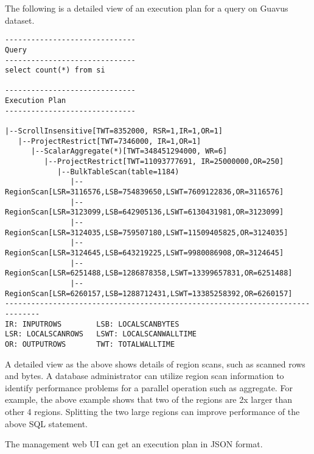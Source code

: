 \documentclass{article}
\begin{document}
The following is a detailed view of an execution plan for a query on Guavus dataset.
\begin{lstlisting}
------------------------------
Query
------------------------------
select count(*) from si

------------------------------
Execution Plan
------------------------------

|--ScrollInsensitive[TWT=8352000, RSR=1,IR=1,OR=1]                                            
   |--ProjectRestrict[TWT=7346000, IR=1,OR=1]                                        
      |--ScalarAggregate(*)[TWT=348451294000, WR=6]
         |--ProjectRestrict[TWT=11093777691, IR=25000000,OR=250]
            |--BulkTableScan(table=1184)
               |--RegionScan[LSR=3116576,LSB=754839650,LSWT=7609122836,OR=3116576]     
               |--RegionScan[LSR=3123099,LSB=642905136,LSWT=6130431981,OR=3123099]
               |--RegionScan[LSR=3124035,LSB=759507180,LSWT=11509405825,OR=3124035]
               |--RegionScan[LSR=3124645,LSB=643219225,LSWT=9980086908,OR=3124645]
               |--RegionScan[LSR=6251488,LSB=1286878358,LSWT=13399657831,OR=6251488]
               |--RegionScan[LSR=6260157,LSB=1288712431,LSWT=13385258392,OR=6260157]
------------------------------------------------------------------------------
IR: INPUTROWS        LSB: LOCALSCANBYTES 
LSR: LOCALSCANROWS   LSWT: LOCALSCANWALLTIME
OR: OUTPUTROWS 	     TWT: TOTALWALLTIME                    
\end{lstlisting}
A detailed view as the above shows details of region scans, such as scanned rows and bytes. A database administrator can utilize region scan information to identify performance problems for a parallel operation such as aggregate. For example, the above example shows that two of the regions are 2x larger than other 4 regions. Splitting the two large regions can improve performance of the above SQL statement.

\noindent
The management web UI can get an execution plan in JSON format.
\end{document}
